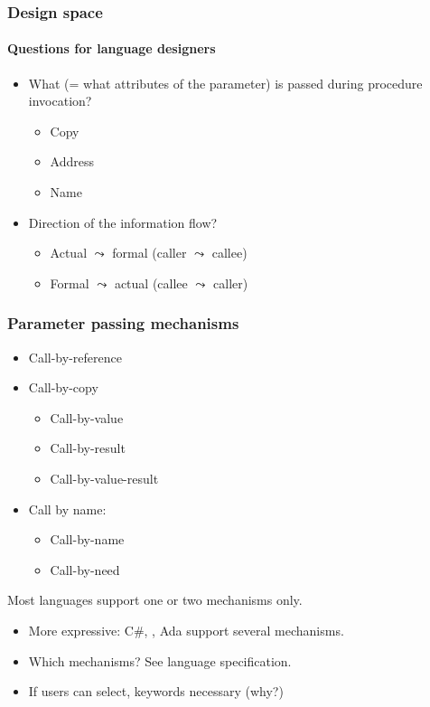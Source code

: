 \documentclass{beamer}
\begin{document}
\begin{frame}[fragile]
\frametitle{Design space}
\framesubtitle{Questions for language designers}
\begin{itemize}
\item What (= what attributes of the parameter) is passed during
procedure invocation? 

\begin{itemize}
\item Copy
\item Address
\item Name 
\end{itemize}
\item Direction of the information flow?
\begin{itemize}
\item Actual $\leadsto$ formal (caller $\leadsto$ callee)
\item Formal $\leadsto$ actual (callee $\leadsto$ caller)
\end{itemize}
\end{itemize}
\end{frame}

\begin{frame}[fragile]
\frametitle{Parameter passing mechanisms}
\begin{itemize}
\item Call-by-reference
\item Call-by-copy
\begin{itemize}
\item Call-by-value
\item Call-by-result
\item Call-by-value-result
\end{itemize}

\item Call by name: 

\begin{itemize}
\item Call-by-name
\item Call-by-need
\end{itemize}
\end{itemize}

Most languages support one or two mechanisms only. 
\begin{itemize}
\item More expressive:  C\#, \Cpp, Ada support several mechanisms.
\item Which mechanisms? See language specification. 
\item If users can select, keywords necessary (why?) 
\end{itemize}



\end{frame}
\end{document}
